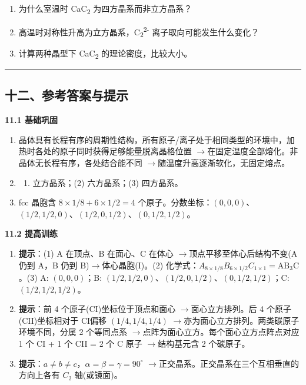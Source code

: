\documentclass[a4paper,11pt]{ctexart}
\providecommand{\tightlist}{\setlength{\itemsep}{0pt}\setlength{\parskip}{0pt}}
\newcommand{\箭}{\ensuremath{\rightarrow}}
\newcommand{\左箭}{\ensuremath{\leftarrow}}
\newcommand{\上箭}{\ensuremath{\uparrow}}
\newcommand{\下箭}{\ensuremath{\downarrow}}
\newcommand{\衡}{\ensuremath{\rightleftharpoons}}
\newcommand{\双箭}{\ensuremath{\leftrightarrow}}
\newcommand{\约等于}{\ensuremath{\approx}}
\newcommand{\小于等于}{\ensuremath{\leq}}
\newcommand{\大于等于}{\ensuremath{\geq}}
\newcommand{\不等于}{\ensuremath{\neq}}
\newcommand{\西格马}{\ensuremath{\sigma}}
\newcommand{\派}{\ensuremath{\pi}}
\begin{document}
\begin{enumerate}
  \begin{enumerate}
  \def\labelenumii{(\arabic{enumii})}
  \tightlist
  \item
    为什么室温时 CaC\textsubscript{2} 为四方晶系而非立方晶系？
  \item
    高温时对称性升高为立方晶系，C\textsubscript{2}\textsuperscript{2-} 离子取向可能发生什么变化？
  \item
    计算两种晶型下 CaC\textsubscript{2} 的理论密度，比较大小。
  \end{enumerate}
\end{enumerate}

\begin{center}\rule{0.5\linewidth}{0.5pt}\end{center}

\subsection{十二、参考答案与提示}\label{ux5341ux4e8cux53c2ux8003ux7b54ux6848ux4e0eux63d0ux793a}

\textbf{11.1 基础巩固}

\begin{enumerate}
\def\labelenumi{\arabic{enumi}.}
\item
  晶体具有长程有序的周期性结构，所有原子/离子处于相同类型的环境中，加热时各处的原子同时获得足够能量脱离晶格位置 \箭 在固定温度全部熔化。非晶体无长程有序，各处结合能不同 \箭 随温度升高逐渐软化，无固定熔点。
\item
  \begin{enumerate}
  \def\labelenumii{(\arabic{enumii})}
  \tightlist
  \item
    立方晶系；(2) 六方晶系；(3) 四方晶系。
  \end{enumerate}
\item
  fcc 晶胞含 \(8 \times 1/8 + 6 \times 1/2 = 4\) 个原子。分数坐标：\((0, 0, 0)\)、\((1/2, 1/2, 0)\)、\((1/2, 0, 1/2)\)、\((0, 1/2, 1/2)\)。
\end{enumerate}

\textbf{11.2 提高训练}

\begin{enumerate}
\def\labelenumi{\arabic{enumi}.}
\setcounter{enumi}{3}
\item
  \textbf{提示}：(1) A 在顶点、B 在面心、C 在体心 \箭 顶点平移至体心后结构不变(A 仍到 A，B 仍到 B)\箭 体心晶胞(I)。(2) 化学式：\(A_{8\times 1/8} B_{6\times 1/2} C_{1\times 1} = \mathrm{AB_3C}\)。(3) A: \((0,0,0)\)；B: \((1/2,1/2,0)\)、\((1/2,0,1/2)\)、\((0,1/2,1/2)\)；C: \((1/2,1/2,1/2)\)。
\item
  \textbf{提示}：前 4 个原子(CI)坐标位于顶点和面心 \箭 面心立方排列。后 4 个原子(CII)坐标相对于 CI偏移 \((1/4, 1/4, 1/4)\) \箭 亦为面心立方排列。两类碳原子环境不同，分属 2 个等同点系 \箭 点阵为面心立方。每个面心立方点阵点对应 1 个 CI + 1 个 CII = 2 个 C 原子 \箭 结构基元含 2 个碳原子。
\item
  \textbf{提示}：\(a \neq b \neq c\)，\(\alpha = \beta = \gamma = 90^\circ\) \箭 正交晶系。正交晶系在三个互相垂直的方向上各有 \(C_2\) 轴(或镜面)。
\end{enumerate}
\end{document}
